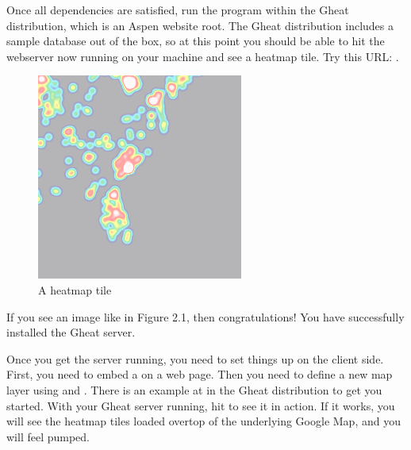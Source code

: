 \documentclass{manual}
\begin{document}
Once all dependencies are satisfied, run the  program within the
Gheat distribution, which is an Aspen website root. The Gheat distribution
includes a sample database out of the box, so at this point you should be able
to hit the webserver now running on your machine and see a heatmap tile. Try
this URL:
.

\begin{figure}[htp]
\includegraphics[bb=0 0 256 256]{img/4,6.png}
\caption{A heatmap tile}\label{fig:tile}
\end{figure}

If you see an image like in Figure 2.1, then congratulations! You have
successfully installed the Gheat server.

Once you get the server running, you need to set things up on the client side.
First, you need to embed a  on a web page. Then you need to define
a new map layer using
and
.
There is an example at  in the Gheat distribution to get you
started. With your Gheat server running, hit
to see it in action. If it works, you will see the heatmap tiles loaded overtop
of the underlying Google Map, and you will feel pumped.

\begin{seealso}
\end{seealso}
\end{document}
